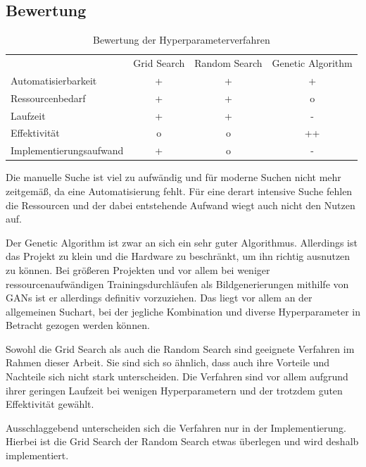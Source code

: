 \subsection{Bewertung}

\begin{table}[H]
	\centering
	\begin{tabular}{l|c|c|c}
		                        & Grid Search & Random Search & Genetic Algorithm \\
		Automatisierbarkeit     &      +      &       +       &         +         \\
		Ressourcenbedarf        &      +      &       +       &         o         \\
		Laufzeit                &      +      &       +       &         -         \\
		Effektivität            &      o      &       o       &        ++         \\
		Implementierungsaufwand &      +      &       o       &         -
	\end{tabular}
	\caption{Bewertung der Hyperparameterverfahren}
\end{table}


Die manuelle Suche ist viel zu aufwändig und für moderne Suchen nicht mehr zeitgemäß, da eine Automatisierung fehlt.
Für eine derart intensive Suche fehlen die Ressourcen und der dabei entstehende Aufwand wiegt auch nicht den Nutzen auf.
\newline

Der Genetic Algorithm ist zwar an sich ein sehr guter Algorithmus.
Allerdings ist das Projekt zu klein und die Hardware zu beschränkt, um ihn richtig ausnutzen zu können.
Bei größeren Projekten und vor allem bei weniger ressourcenaufwändigen Trainingsdurchläufen als Bildgenerierungen mithilfe von GANs ist er allerdings definitiv vorzuziehen.
Das liegt vor allem an der allgemeinen Suchart, bei der jegliche Kombination und diverse Hyperparameter in Betracht gezogen werden können.
\newline

Sowohl die Grid Search als auch die Random Search sind geeignete Verfahren im Rahmen dieser Arbeit.
Sie sind sich so ähnlich, dass auch ihre Vorteile und Nachteile sich nicht stark unterscheiden.
Die Verfahren sind vor allem aufgrund ihrer geringen Laufzeit bei wenigen Hyperparametern und der trotzdem guten Effektivität gewählt.

Ausschlaggebend unterscheiden sich die Verfahren nur in der Implementierung.
Hierbei ist die Grid Search der Random Search etwas überlegen und wird deshalb implementiert.


